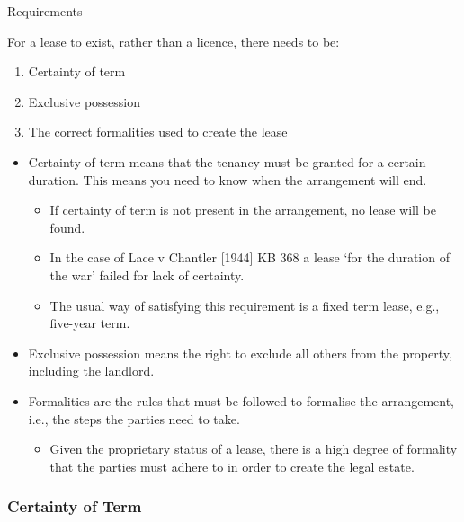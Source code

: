 \documentclass[
]{article}
\providecommand{\tightlist}{%
  \setlength{\itemsep}{0pt}\setlength{\parskip}{0pt}}
\newenvironment{env-b23dd66a-8a6c-447d-a163-3614469799d6}
{
    \savenotes\tcolorbox[blanker,breakable,left=5pt,borderline west={2pt}{-4pt}{cyan}]
}
{
    \endtcolorbox\spewnotes
}
\begin{document}
\begin{env-b23dd66a-8a6c-447d-a163-3614469799d6}

Requirements

For a lease to exist, rather than a licence, there needs to be:

\begin{enumerate}
\tightlist
\item
  Certainty of term
\item
  Exclusive possession
\item
  The correct formalities used to create the lease
\end{enumerate}

\end{env-b23dd66a-8a6c-447d-a163-3614469799d6}

\begin{itemize}
\tightlist
\item
  Certainty of term means that the tenancy must be granted for a certain
  duration. This means you need to know when the arrangement will end.

  \begin{itemize}
  \tightlist
  \item
    If certainty of term is not present in the arrangement, no lease
    will be found.
  \item
    In the case of Lace v Chantler {[}1944{]} KB 368 a lease `for the
    duration of the war' failed for lack of certainty.
  \item
    The usual way of satisfying this requirement is a fixed term lease,
    e.g., five-year term.
  \end{itemize}
\item
  Exclusive possession means the right to exclude all others from the
  property, including the landlord.
\item
  Formalities are the rules that must be followed to formalise the
  arrangement, i.e., the steps the parties need to take.

  \begin{itemize}
  \tightlist
  \item
    Given the proprietary status of a lease, there is a high degree of
    formality that the parties must adhere to in order to create the
    legal estate.
  \end{itemize}
\end{itemize}

\hypertarget{certainty-of-term}{%
\subsubsection{Certainty of Term}\label{certainty-of-term}}
\end{document}
